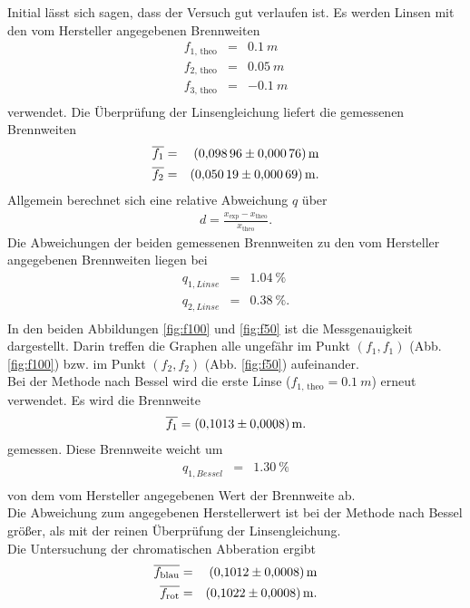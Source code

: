 Initial lässt sich sagen, dass der Versuch gut verlaufen ist.
Es werden Linsen mit den vom Hersteller angegebenen Brennweiten
\begin{align*}
  f_{\text{1, theo}} &=& \SI{0.1}{m}\\
  f_{\text{2, theo}} &=& \SI{0.05}{m}\\
  f_{\text{3, theo}} &=& \SI{-0.1}{m}\\
\end{align*}
verwendet.
Die Überprüfung der Linsengleichung liefert die gemessenen Brennweiten
\begin{align*}
  \overline{f_{1}} &=& \SI{0.09896 \pm 0.00076}{m}\\
  \overline{f_{2}} &=& \SI{0.05019 \pm 0.00069}{m}.\\
\end{align*}
Allgemein berechnet sich eine relative Abweichung $q$ über
\begin{align*}
  d= \frac{x_{\text{exp}}-x_{\text{theo}}}{x_{\text{theo}}}.
\end{align*}
Die Abweichungen der beiden gemessenen Brennweiten zu den vom Hersteller angegebenen Brennweiten liegen bei
\begin{align*}
  q_{1, Linse} &=& \SI{1.04}{\%}\\
  q_{2, Linse} &=& \SI{0.38}{\%}.\\
\end{align*}
In den beiden Abbildungen \ref{fig:f100} und \ref{fig:f50} ist die Messgenauigkeit dargestellt.
Darin treffen die Graphen alle ungefähr im Punkt $(f_{1}, f_{1})$ (Abb. \ref{fig:f100}) bzw. im Punkt $(f_{2}, f_{2})$ (Abb. \ref{fig:f50}) aufeinander.
\\Bei der Methode nach Bessel wird die erste Linse ($f_{\text{1, theo}} = \SI{0.1}{m}$) erneut verwendet.
Es wird die Brennweite
\begin{align*}
  \overline{f_{1}}= \SI{0.1013 \pm 0.0008}{m}.
\end{align*}
gemessen.
Diese Brennweite weicht um
\begin{align*}
  q_{1, Bessel} &=& \SI{1.30}{\%}\\
\end{align*}
von dem vom Hersteller angegebenen Wert der Brennweite ab.
\\Die Abweichung zum angegebenen Herstellerwert ist bei der Methode nach Bessel größer, als mit der reinen Überprüfung der Linsengleichung.
\\Die Untersuchung der chromatischen Abberation ergibt
\begin{align*}
  \overline{f_{\text{blau}}} &=& \SI{0.1012 \pm 0.0008}{m}\\
  \overline{f_{\text{rot}}}  &=& \SI{0.1022 \pm 0.0008}{m}.\\
\end{align*}
